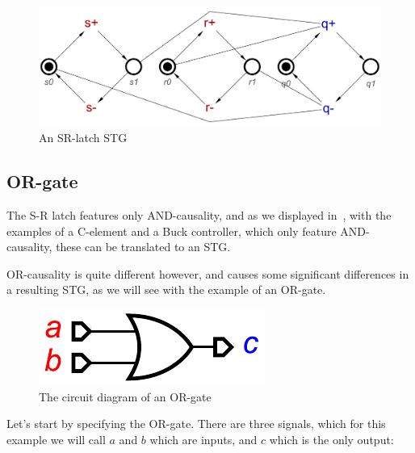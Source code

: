 \documentclass[british,conference,compsoc]{IEEEtran}
\begin{document}
\begin{figure}[h]
\begin{centering}
\includegraphics[scale=0.25]{Images/sr-latch-stg}
\par\end{centering}
\protect\caption{\label{fig:sr-latch-stg} An SR-latch STG}
\end{figure}

\subsection{OR-gate \label{sub:or-gate}}

The S-R latch features only AND-causality, and as we displayed 
in~\cite{2015_Beaumont_MEMOCODE}, with the examples of a C-element 
and a Buck controller, which only feature AND-causality, these can be translated
to an STG. 

OR-causality is quite different however, and causes some significant differences 
in a resulting STG, as we will see with the example of an OR-gate. 

\begin{figure}[h]
\begin{centering}
\includegraphics[scale=0.55]{Images/or-gate-circuit}
\par\end{centering}

\protect\caption{\label{fig:or-gate-circuit} The circuit diagram of an OR-gate}
\end{figure}

Let's start by specifying the OR-gate. There are three signals, which for this 
example we will call $a$ and $b$ which are inputs, and $c$ which is the only output:
\end{document}
